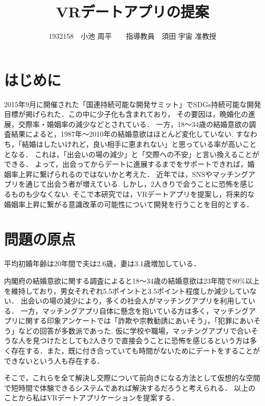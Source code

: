 \documentclass[twocolumn,10pt,a4j]{ltjsarticle}
\title{VRデートアプリの提案}
\author{1932158　小池 周平　　指導教員　須田 宇宙 准教授}
\date{ }
\begin{document}
\maketitle

\section{はじめに}



2015年9月に開催された「国連持続可能な開発サミット」でSDGs持続可能な開発目標が掲げられた．この中に少子化も含まれており，
その要因は，晩婚化の進展\cite{sasaki2012}，交際率・婚姻率の減少\cite{naikakufu2019}などとされている．
一方，18〜34歳の結婚意欲の調査結果によると，1987年〜2010年の結婚意欲はほとんど変化していない.
すなわち，「結婚はしたいけれど，良い相手に恵まれない」と思っている率が高いこととなる\cite{naikakufu2019}．
これは，「出会いの場の減少」と「交際への不安」と言い換えることができる．
よって，出会ってからデートに進展するまでをサポートできれば，婚姻率上昇に繋げられるのではないかと考えた．
近年では，SNSやマッチングアプリを通じて出会う者が増えている\cite{cancan}.
しかし，2人きりで会うことに恐怖を感じるものも少なくない\cite{prtimes,yoshimura2020}.
そこで本研究では，VRデートアプリを提案し，将来的な婚姻率上昇に繋がる意識改革の可能性について開発を行うことを目的とする．



\section{問題の原点}
平均初婚年齢は20年間で夫は2.6歳，妻は3.1歳増加している．

内閣府の結婚意欲に関する調査によると18～34歳の結婚意欲は23年間で80\%以上を維持しており，男女それぞれ5.5ポイントと3.5ポイント程度しか減少していない．
出会いの場の減少により，多くの社会人がマッチングアプリを利用している．
一方，マッチングアプリ自体に懸念を抱いている方は多く，マッチングアプリに関する印象アンケートでは「詐欺や宗教勧誘にあいそう」，「犯罪にあいそう」などの回答が多数派であった\cite{prtimes}.
仮に学校や職場，マッチングアプリで合いそうな人を見つけたとしても2人きりで直接会うことに恐怖を感じるという方は多く存在する\cite{yoshimura2020}．また，既に付き合っていても時間がないためにデートをすることができないという人も存在する．


そこで，これらを全て解決し交際について前向きになる方法として仮想的な空間で短時間で体験できるシステムであれば解決するだろうと考えられる．
以上のことから私はVRデートアプリケーションを提案する．
\end{document}
